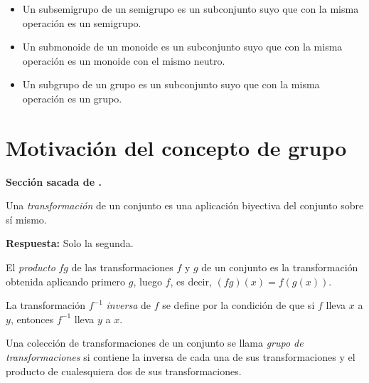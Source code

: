 \begin{itemize}
\item Un subsemigrupo de un semigrupo es un subconjunto suyo que con la misma operación es un semigrupo.

\item Un submonoide de un monoide es un subconjunto suyo que con la misma operación es un monoide con el mismo neutro.

\item Un subgrupo de un grupo es un subconjunto suyo que con la misma operación es un grupo.
\end{itemize}

\clearpage
\section{Motivación del concepto de grupo}

\noindent\textbf{Sección sacada de \cite{arnold:odes}.}
\vspace{0.4cm}

Una \textit{transformación} de un conjunto es una aplicación biyectiva del conjunto sobre sí mismo.


\noindent\textbf{Respuesta:} Solo la segunda.
\vspace{0.4cm}


El \textit{producto} $fg$ de las transformaciones $f$ y $g$ de un conjunto es la transformación obtenida aplicando primero $g$, luego $f$, es decir, $(fg)(x)=f(g(x))$.


La transformación $f^{-1}$ \textit{inversa} de $f$ se define por la condición de que si $f$ lleva $x$ a $y$, entonces $f^{-1}$ lleva $y$ a $x$.

Una colección de transformaciones de un conjunto se llama \textit{grupo de transformaciones} si contiene la inversa de cada una de sus transformaciones y el producto de cualesquiera dos de sus transformaciones.



